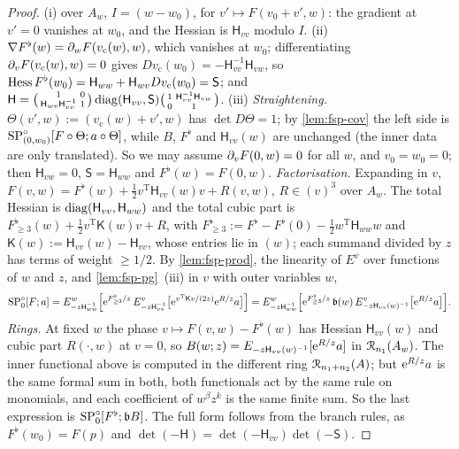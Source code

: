 \begin{proof}
(i)  over $A_w$, $I=(w-w_0)$, for $v'\mapsto F(v_0+v',w)$: the gradient at $v'=0$ vanishes at $w_0$, and the Hessian is $\mathsf H_{vv}$ modulo $I$.
(ii) $\nabla F^\flat(w)=\partial_wF(v_{\mathrm c}(w),w)$, which vanishes at $w_0$; differentiating $\partial_vF(v_{\mathrm c}(w),w)=0$ gives $Dv_{\mathrm c}(w_0)=-\mathsf H_{vv}^{-1}\mathsf H_{vw}$, so $\operatorname{Hess} F^\flat(w_0)=\mathsf H_{ww}+\mathsf H_{wv}Dv_{\mathrm c}(w_0)=\mathsf S$; and $\mathsf H=\bigl(\begin{smallmatrix}1&0\\ \mathsf H_{wv}\mathsf H_{vv}^{-1}&1\end{smallmatrix}\bigr)\operatorname{diag}(\mathsf H_{vv},\mathsf S)\bigl(\begin{smallmatrix}1&\mathsf H_{vv}^{-1}\mathsf H_{vw}\\0&1\end{smallmatrix}\bigr)$.
(iii) \emph{Straightening.} $\Theta(v',w):=(v_{\mathrm c}(w)+v',w)$ has $\det D\Theta=1$; by \cref{lem:fsp-cov} the left side is $\mathrm{SP}^{\circ}_{(0,w_0)}[F\circ\Theta;a\circ\Theta]$, while $B$, $F^\flat$ and $\mathsf H_{vv}(w)$ are unchanged (the inner data are only translated). So we may assume $\partial_vF(0,w)=0$ for all $w$, and $v_0=w_0=0$; then $\mathsf H_{vw}=0$, $\mathsf S=\mathsf H_{ww}$ and $F^\flat(w)=F(0,w)$.
\emph{Factorisation.} Expanding in $v$, $F(v,w)=F^\flat(w)+\frac12v^{\mathrm T}\mathsf H_{vv}(w)v+R(v,w)$, $R\in(v)^3$ over $A_w$. The total Hessian is $\operatorname{diag}(\mathsf H_{vv},\mathsf H_{ww})$ and the total cubic part is $F^\flat_{\geq3}(w)+\frac12v^{\mathrm T}\mathsf K(w)v+R$, with $F^\flat_{\geq3}:=F^\flat-F^\flat(0)-\frac12w^{\mathrm T}\mathsf H_{ww}w$ and $\mathsf K(w):=\mathsf H_{vv}(w)-\mathsf H_{vv}$, whose entries lie in $(w)$; each summand divided by $z$ has terms of weight $\geq1/2$. By \cref{lem:fsp-prod}, the linearity of $E^v$ over functions of $w$ and $z$, and \cref{lem:fsp-pg}~(iii) in $v$ with outer variables $w$,
\[
\mathrm{SP}^{\circ}_0[F;a]=E^w_{-z\mathsf H_{ww}^{-1}}\Bigl[\mathrm{e}^{F^\flat_{\geq3}/z}\,E^v_{-z\mathsf H_{vv}^{-1}}\bigl[\mathrm{e}^{v^{\mathrm T}\mathsf Kv/(2z)}\mathrm{e}^{R/z}a\bigr]\Bigr]=E^w_{-z\mathsf H_{ww}^{-1}}\Bigl[\mathrm{e}^{F^\flat_{\geq3}/z}\,\mathfrak b(w)\,E^v_{-z\mathsf H_{vv}(w)^{-1}}\bigl[\mathrm{e}^{R/z}a\bigr]\Bigr].
\]
\emph{Rings.} At fixed $w$ the phase $v\mapsto F(v,w)-F^\flat(w)$ has Hessian $\mathsf H_{vv}(w)$ and cubic part $R(\cdot,w)$ at $v=0$, so $B(w;z)=E_{-z\mathsf H_{vv}(w)^{-1}}[\mathrm{e}^{R/z}a]$ in $\mathcal{R}_{n_1}(A_w)$. The inner functional above is computed in the different ring $\mathcal{R}_{n_1+n_2}(A)$; but $\mathrm{e}^{R/z}a$ is the same formal sum in both, both functionals act by the same rule on monomials, and each coefficient of $w^\beta z^k$ is the same finite sum. So the last expression is $\mathrm{SP}^{\circ}_0[F^\flat;\mathfrak bB]$. The full form follows from the branch rules, as $F^\flat(w_0)=F(p)$ and $\det(-\mathsf H)=\det(-\mathsf H_{vv})\det(-\mathsf S)$.
\end{proof}


